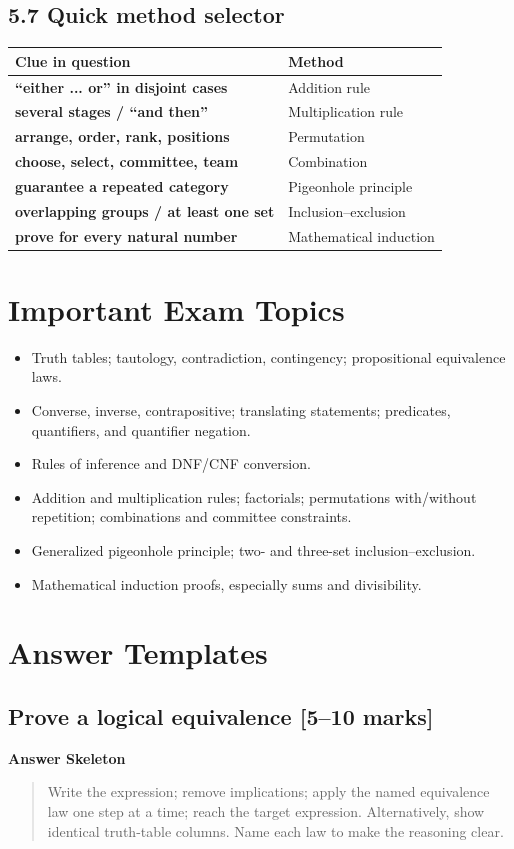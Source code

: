 \documentclass[11pt,a4paper]{article}
\newenvironment{answerbox}{\par\medskip\noindent\color{green}\textbf{Answer Skeleton}\par\smallskip\color{black}\begin{quote}}{\end{quote}\medskip}
\newcommand{\mkmarks}[1]{\hfill\textbf{[#1 marks]}}
\begin{document}
\subsection{5.7 Quick method selector}
\begin{center}\small
\begin{tabularx}{\textwidth}{>{\bfseries}p{} X}
\toprule Clue in question & Method\\\midrule
“either ... or” in disjoint cases & Addition rule\\
several stages / “and then” & Multiplication rule\\
arrange, order, rank, positions & Permutation\\
choose, select, committee, team & Combination\\
guarantee a repeated category & Pigeonhole principle\\
overlapping groups / at least one set & Inclusion--exclusion\\
prove for every natural number & Mathematical induction\\
\bottomrule
\end{tabularx}\end{center}

\section{Important Exam Topics}
\begin{itemize}
\item Truth tables; tautology, contradiction, contingency; propositional equivalence laws.
\item Converse, inverse, contrapositive; translating statements; predicates, quantifiers, and quantifier negation.
\item Rules of inference and DNF/CNF conversion.
\item Addition and multiplication rules; factorials; permutations with/without repetition; combinations and committee constraints.
\item Generalized pigeonhole principle; two- and three-set inclusion--exclusion.
\item Mathematical induction proofs, especially sums and divisibility.
\end{itemize}

\section{Answer Templates}
\subsection{Prove a logical equivalence \mkmarks{5--10}}
\begin{answerbox}Write the expression; remove implications; apply the named equivalence law one step at a time; reach the target expression. Alternatively, show identical truth-table columns. Name each law to make the reasoning clear.\end{answerbox}
\end{document}
